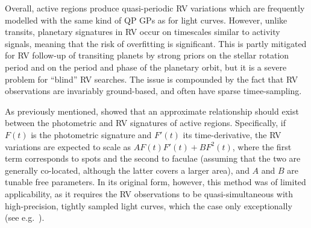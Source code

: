 \documentclass[letterpaper]{ar-1col}
\begin{document}
Overall, active regions produce quasi-periodic RV variations which are frequently modelled with the same kind of QP GPs as for light curves. However, unlike transits, planetary signatures in RV occur on timescales similar to activity signals, meaning that the risk of overfitting is significant. This is partly mitigated for RV follow-up of transiting planets by strong priors on the stellar rotation period and on the period and phase of the planetary orbit, but it is a severe problem for ``blind'' RV searches. The issue is compounded by the fact that RV observations are invariably ground-based, and often have sparse timee-sampling.

As previously mentioned, \citet{2012MNRAS.419.3147A} showed that an approximate relationship should exist between the photometric and RV signatures of active regions. Specifically, if $F(t)$ is the photometric signature and $F'(t)$ its time-derivative, the RV variations are expected to scale as $A F(t) F'(t) + B F^2(t)$, where the first term corresponds to spots and the second to faculae (assuming that the two are generally co-located, although the latter covers a larger area), and $A$ and $B$ are tunable free parameters. In its original form, however, this method was of limited applicability, as it requires the RV observations to be quasi-simultaneous with high-precision, tightly sampled light curves, which the case only exceptionally (see e.g.\ \citealt{2014MNRAS.443.2517H}).
\end{document}
